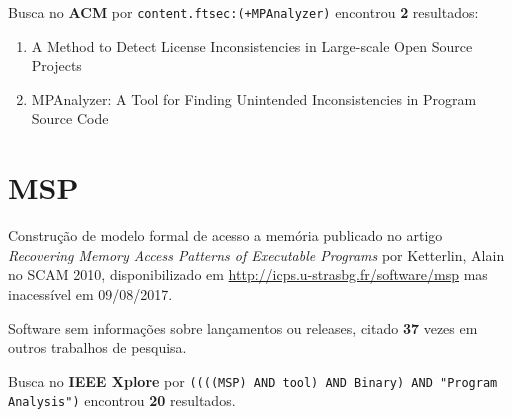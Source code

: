 Busca no {\bf ACM} por
\texttt{content.ftsec:(+MPAnalyzer)}
encontrou {\bf 2}
resultados:

\begin{enumerate}
\item A Method to Detect License Inconsistencies in Large-scale Open Source Projects
\item MPAnalyzer: A Tool for Finding Unintended Inconsistencies in Program Source Code
\end{enumerate}

\section{MSP}

Construção de modelo formal de acesso a memória
publicado no artigo {\it Recovering Memory Access Patterns of Executable Programs}
por Ketterlin, Alain
no SCAM 2010,
disponibilizado em \url{http://icps.u-strasbg.fr/software/msp}
mas inacessível em 09/08/2017.

Software sem informações sobre lançamentos ou releases,
citado {\bf 37} vezes em outros trabalhos de pesquisa.

Busca no {\bf IEEE Xplore} por
\texttt{((((MSP) AND tool) AND Binary) AND "Program Analysis")}
encontrou {\bf 20}
resultados.

